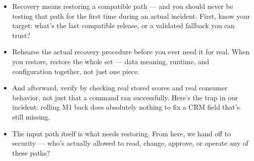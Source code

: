 \documentclass[11pt,a4paper]{article}
\begin{document}
\begin{examplebox}[title after break={SPOKEN SCRIPT --- slide 39 continued}]
\begin{itemize}
\item Recovery means restoring a compatible path — and you should never be testing that path for the first time during an actual incident. First, know your target: what's the last compatible release, or a validated fallback you can trust?
\item Rehearse the actual recovery procedure before you ever need it for real. When you restore, restore the whole set — data meaning, runtime, and configuration together, not just one piece.
\item And afterward, verify by checking real stored scores and real consumer behavior, not just that a command ran successfully. Here's the trap in our incident: rolling M1 back does absolutely nothing to fix a CRM field that's still missing.
\item The input path itself is what needs restoring. From here, we hand off to security — who's actually allowed to read, change, approve, or operate any of these paths?
\end{itemize}
\end{examplebox}
\par\noindent{\scriptsize\textcolor{teal!60!black}{Reading anchor: Breck, infrastructure tests 6–7}}
\clearpage
\end{document}
